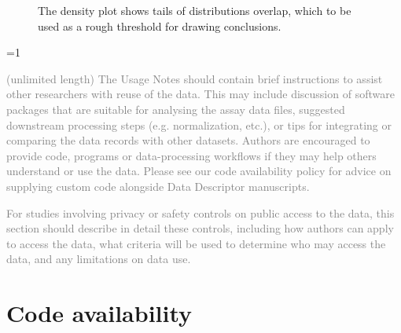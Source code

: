 \documentclass[fleqn,10pt]{wlscirep}
\newcommand{\ifinstruction}{0} %
\begin{document}
\begin{figure}


\caption{\label{fig-ccf-density}The density plot shows tails of
distributions overlap, which to be used as a rough threshold for drawing
conclusions.}

\end{figure}%

\ifnum \ifinstruction=1

\textcolor{gray}{(unlimited length) The Usage Notes should contain brief instructions to assist other researchers with reuse of the data. This may include discussion of software packages that are suitable for analysing the assay data files, suggested downstream processing steps (e.g. normalization, etc.), or tips for integrating or comparing the data records with other datasets. Authors are encouraged to provide code, programs or data-processing workflows if they may help others understand or use the data. Please see our code availability policy for advice on supplying custom code alongside Data Descriptor manuscripts.}

\textcolor{gray}{For studies involving privacy or safety controls on public access to the data, this section should describe in detail these controls, including how authors can apply to access the data, what criteria will be used to determine who may access the data, and any limitations on data use.}
\fi

\section*{Code availability}\label{sec-code-availability}
\end{document}
